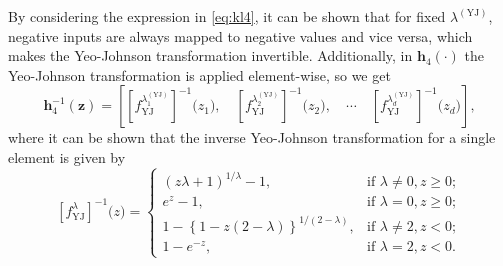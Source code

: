 \documentclass{statsmsc}
\begin{document}
{By considering the expression in \cref{eq:kl4}, it can be shown that for fixed
$\lambda^{(\textrm{YJ})}$, negative inputs are always
mapped to negative values and vice versa, which makes the Yeo-Johnson transformation invertible.
Additionally, in $\mathbf{h}_4(\cdot)$ the Yeo-Johnson transformation is applied element-wise, so
we get
\begin{equation}
    \mathbf{h}_4^{-1}(\mathbf{z})=\left[
        \left[f_{\textrm{YJ}}^{\lambda_1^{(\textrm{YJ})}}\right]^{-1}\bigg(z_1\bigg), \quad
        \left[f_{\textrm{YJ}}^{\lambda_2^{(\textrm{YJ})}}\right]^{-1}\bigg(z_2\bigg), \quad \cdots \quad
    \left[f_{\textrm{YJ}}^{\lambda_d^{(\textrm{YJ})}}\right]^{-1}\bigg(z_d\bigg) \right],
\end{equation}
where it can be shown that the inverse Yeo-Johnson transformation for a single element is given by
\begin{equation}
    \left[f_{\textrm{YJ}}^\lambda\right]^{-1}\bigg(z\bigg)= \left\{
    \begin{array}{ll}
        (z \lambda + 1)^{1/\lambda} -1, & \textrm{if } \lambda \neq 0, z \geq 0; \\
        e^z-1, & \textrm{if } \lambda = 0, z \geq 0;  \\
        1-\left\{1-z(2-\lambda)\right\}^{1/ (2-\lambda)} , & \textrm{if } \lambda \neq 2, z < 0; \\
        1-e^{-z}, & \textrm{if } \lambda=2, z < 0.
    \end{array}
    \right.
\end{equation}

}
\end{document}
